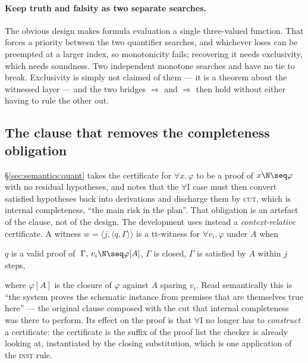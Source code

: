 \paragraph{Keep truth and falsity as two separate searches.}
The obvious design makes formula evaluation a single three-valued function.
That forces a priority between the two quantifier searches, and whichever loses
can be preempted at a larger index, so monotonicity fails; recovering it needs
exclusivity, which needs soundness.  Two independent monotone searches
 and  have no tie to break.  Exclusivity is simply not
claimed of them --- it is a theorem about the witnessed layer --- and the two
bridges  $\Rightarrow$  and 
$\Rightarrow$  then hold without either having to rule the other
out.

\subsection{The clause that removes the completeness obligation}

\S\ref{sec:semantics:quant} takes the certificate for $\forall x.\,\varphi$ to be
a proof of $x \N \seq \varphi$ with no residual hypotheses, and notes that the
$\forall$I case must then convert satisfied hypotheses back into derivations and
discharge them by \textsc{cut}, which is internal completeness, ``the main risk
in the plan''.  That obligation is an artefact of the clause, not of the design.
The development uses instead a \emph{context-relative} certificate.  A witness
$w = \langle j, \langle q, \Gamma\rangle\rangle$ is a tt-witness for
$\forall v_i.\,\varphi$ under $A$ when

\begin{center}
$q$ is a valid proof of $\;\Gamma,\, v_i \N \seq \varphi[A]$, \quad
$\Gamma$ is closed, \quad
$\Gamma$ is satisfied by $A$ within $j$ steps,
\end{center}

\noindent
where $\varphi[A]$ is the closure of $\varphi$ against $A$ sparing $v_i$.  Read
semantically this is ``the system proves the schematic instance from premises
that are themselves true here'' --- the original clause composed with the cut
that internal completeness was there to perform.  Its effect on the proof is
that $\forall$I no longer has to \emph{construct} a certificate: the certificate
is the suffix of the proof list the checker is already looking at, instantiated
by the closing substitution, which is one application of the \textsc{inst} rule.

